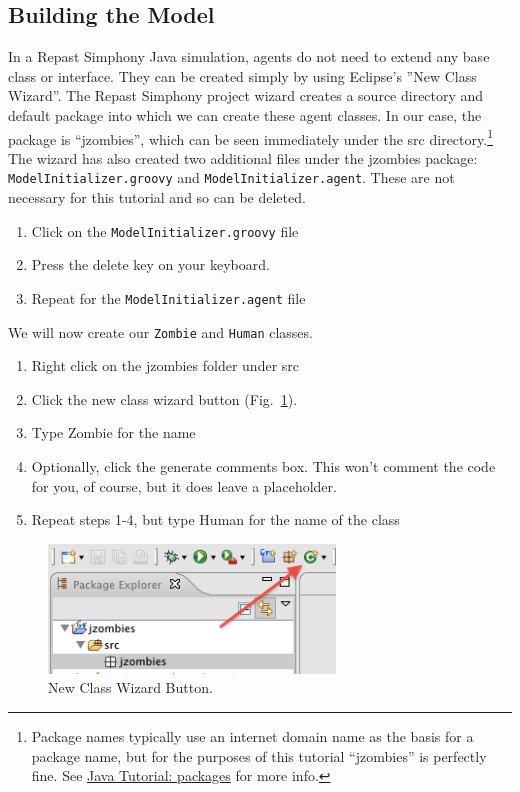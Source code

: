 \documentclass[11pt]{amsart}
\begin{document}
\subsection{Building the Model}
In a Repast Simphony Java simulation, agents do not need to extend any base class or interface. They can be created simply by using Eclipse's ''New Class Wizard''. The Repast Simphony project wizard creates a source directory and default package into which we can create these agent classes. In our case, the package is ``jzombies'', which can be seen immediately under the src directory.\footnote{Package names typically use an internet domain name as the basis for a package name, but for the purposes of this tutorial ``jzombies'' is perfectly fine. See  \href{http://download.oracle.com/javase/tutorial/java/package/namingpkgs.html}{Java Tutorial: packages} for more info.} The wizard has also created two additional files under the jzombies package: \texttt{ModelInitializer.groovy} and \texttt{ModelInitializer.agent}. These are not necessary for this tutorial and so can be deleted.

\vspace{.2in}
\begin{enumerate}
\item Click on the  \texttt{ModelInitializer.groovy} file
\item Press the delete key on your keyboard. 
\item Repeat for the \texttt{ModelInitializer.agent} file
\end{enumerate}

\vspace{.2in}
We will now create our \texttt{Zombie} and \texttt{Human} classes.
\begin{enumerate}
\item Right click on the jzombies folder under src
\item Click the new class wizard button (Fig.~\ref{fig:class_wizard}).
\item Type Zombie for the name
\item Optionally, click the generate comments box. This won't comment the code for you, of course, but it does
leave a placeholder.
\item Repeat steps 1-4, but type Human for the name of the class
\end{enumerate}

\begin{figure}[h]
\begin{center}
\vspace{.2in}
\centerline {
\includegraphics[width=3in]{GettingStartedImages/class_wizard.png}
}
\caption{New Class Wizard Button.}
\label{fig:class_wizard}
\end{center}
\end{figure}
\end{document}
